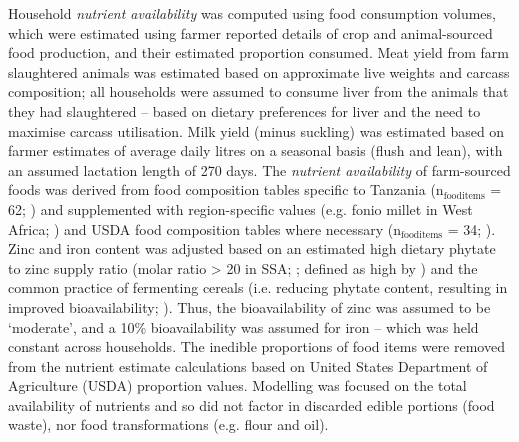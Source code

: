 Household \textit{nutrient availability} was computed using food consumption volumes, which were estimated using farmer reported details of crop and animal-sourced food production, and their estimated proportion consumed. Meat yield from farm slaughtered animals was estimated based on approximate live weights and carcass composition; all households were assumed to consume liver from the animals that they had slaughtered -- based on dietary preferences for liver and the need to maximise carcass utilisation. Milk yield (minus suckling) was estimated based on farmer estimates of average daily litres on a seasonal basis (flush and lean), with an assumed lactation length of 270 days. The \textit{nutrient availability} of farm-sourced foods was derived from food composition tables specific to Tanzania (n$_{\mathrm{food items}}$ = 62; \citealp{Lukmanji2008}) and supplemented with region-specific values (e.g. fonio millet in West Africa; \citealp{FAO2012}) and USDA food composition tables where necessary (n$_{\mathrm{food items}}$ = 34; \citealp{USDepartmentofAgricultureUSDA2017}). Zinc and iron content was adjusted based on an estimated high dietary phytate to zinc supply ratio (molar ratio {\textgreater} 20 in SSA; \citealp{Joy2014}; defined as high by \citealp{Brown2001}) and the common practice of fermenting cereals (i.e. reducing phytate content, resulting in improved bioavailability; \citealp{Nout2009}). Thus, the bioavailability of zinc was assumed to be `moderate', and a 10\% bioavailability was assumed for iron -- which was held constant across households. The inedible proportions of food items were removed from the nutrient estimate calculations based on United States Department of Agriculture (USDA) proportion values. Modelling was focused on the total availability of nutrients and so did not factor in discarded edible portions (food waste), nor food transformations (e.g. flour and oil).

